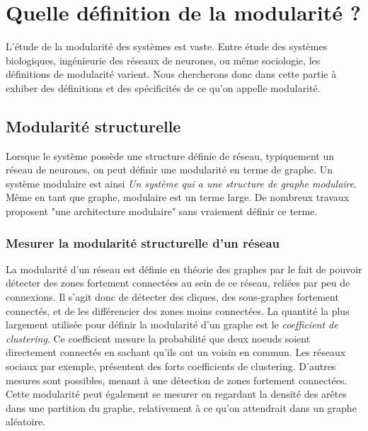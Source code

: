 \section{Quelle définition de la modularité ?}

L'étude de la modularité des systèmes est vaste. Entre étude des systèmes biologiques, ingénieurie des réseaux de neurones, ou même sociologie, les définitions de modularité varient. Nous chercherons donc dans cette partie à exhiber des définitions et des spécificités de ce qu'on appelle modularité.

\subsection{Modularité structurelle}

Lorsque le système possède une structure définie de réseau, typiquement un réseau de neurones, on peut définir une modularité en terme de graphe. Un système modulaire est ainsi \emph{Un système qui a une structure de graphe modulaire}.
Même en tant que graphe, modulaire est un terme large. De nombreux travaux proposent "une architecture modulaire" sans vraiement définir ce terme. 

\subsubsection{Mesurer la modularité structurelle d'un réseau}

La modularité d'un réseau est définie en théorie des graphes par le fait de pouvoir détecter des zones fortement connectées au sein de ce réseau, reliées par peu de connexions. Il s'agit donc de détecter des cliques, des sous-graphes fortement connectés, et de les différencier des zones moins connectées. 
La quantité la plus largement utilisée pour définir la	modularité d'un graphe est le \emph{coefficient de clustering}. Ce coefficient mesure la probabilité que deux noeuds soient directement connectés en sachant qu'ils ont un voisin en commun. Les réseaux sociaux par exemple, présentent des forts coefficients de clustering. D'autres mesures sont possibles, menant à une détection de zones fortement connectées. Cette modularité peut également se mesurer en regardant la densité des arêtes dans une partition du graphe, relativement à ce qu'on attendrait dans un graphe aléatoire. 


